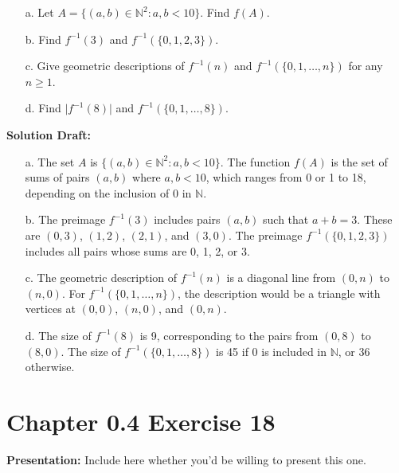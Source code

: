 \documentclass{article}
\begin{document}
\begin{enumerate}
    \item[a.] Let \( A = \{(a, b) \in \mathbb{N}^2 : a, b < 10\} \). Find \( f(A) \).

    \item[b.] Find \( f^{-1}(3) \) and \( f^{-1}(\{0, 1, 2, 3\}) \).

    \item[c.] Give geometric descriptions of \( f^{-1}(n) \) and \( f^{-1}(\{0, 1, \ldots, n\}) \) for any \( n \geq 1 \).

    \item[d.] Find \( \lvert f^{-1}(8) \rvert \) and \( f^{-1}(\{0, 1, \ldots, 8\}) \).
\end{enumerate}

\noindent\textbf{Solution Draft:} 

\begin{enumerate}

\item[a.]
The set \( A \) is \( \{(a, b) \in \mathbb{N}^2 : a, b < 10\} \). The function \( f(A) \) is the set of sums of pairs \( (a, b) \) where \( a, b < 10 \), which ranges from 0 or 1 to 18, depending on the inclusion of 0 in \( \mathbb{N} \).

\item[b.]
The preimage \( f^{-1}(3) \) includes pairs \( (a, b) \) such that \( a + b = 3 \). These are \( (0, 3) \), \( (1, 2) \), \( (2, 1) \), and \( (3, 0) \). The preimage \( f^{-1}(\{0, 1, 2, 3\}) \) includes all pairs whose sums are 0, 1, 2, or 3.

\item[c.]
The geometric description of \( f^{-1}(n) \) is a diagonal line from \( (0, n) \) to \( (n, 0) \). For \( f^{-1}(\{0, 1, \ldots, n\}) \), the description would be a triangle with vertices at \( (0, 0) \), \( (n, 0) \), and \( (0, n) \).

\item[d.]
The size of \( f^{-1}(8) \) is 9, corresponding to the pairs from \( (0, 8) \) to \( (8, 0) \). The size of \( f^{-1}(\{0, 1, \ldots, 8\}) \) is 45 if 0 is included in \( \mathbb{N} \), or 36 otherwise.
\end{enumerate}


\section*{Chapter 0.4 Exercise 18}  

\noindent\textbf{Presentation:} Include here whether you'd be willing to present this one. 
\end{document}
